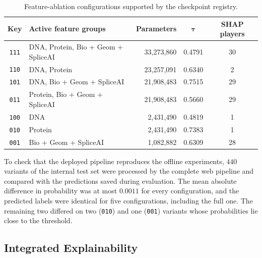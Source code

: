 \begin{table}[htbp]
    \centering
    \caption{Feature-ablation configurations supported by the checkpoint registry.}
    \label{tab:ablation_configs}
    \begin{tabular}{clrcc}
        \toprule
        \textbf{Key} & \textbf{Active feature groups} & \textbf{Parameters} & $\boldsymbol{\tau}$ & \textbf{SHAP players} \\
        \midrule
        \texttt{111} & DNA, Protein, Bio + Geom + SpliceAI & 33,273,860 & 0.4791 & 30 \\
        \texttt{110} & DNA, Protein & 23,257,091 & 0.6340 & 2 \\
        \texttt{101} & DNA, Bio + Geom + SpliceAI & 21,908,483 & 0.7515 & 29 \\
        \texttt{011} & Protein, Bio + Geom + SpliceAI & 21,908,483 & 0.5660 & 29 \\
        \texttt{100} & DNA & 2,431,490 & 0.4819 & 1 \\
        \texttt{010} & Protein & 2,431,490 & 0.7383 & 1 \\
        \texttt{001} & Bio + Geom + SpliceAI & 1,082,882 & 0.6309 & 28 \\
        \bottomrule
    \end{tabular}
\end{table}

To check that the deployed pipeline reproduces the offline experiments, $440$ variants of the internal test set were processed by the complete web pipeline and compared with the predictions saved during evaluation. The mean absolute difference in probability was at most $0.0011$ for every configuration, and the predicted labels were identical for five configurations, including the full one. The remaining two differed on two (\texttt{010}) and one (\texttt{001}) variants whose probabilities lie close to the threshold.

\subsection{Integrated Explainability}

